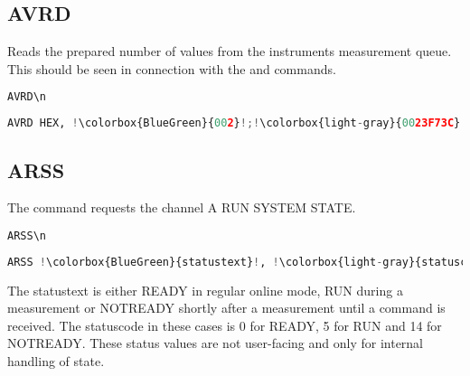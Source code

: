 \documentclass[]{scrartcl}
\begin{document}
	\subsection{AVRD}
	Reads the prepared number of values from the instruments measurement queue.
	This should be seen in connection with the  and  commands.
\begin{lstlisting}[language=Python,escapechar=!,caption=Request (AIC$\rightarrow{}$Instrument) Read Values from Queue,breaklines=true,showspaces=true]
AVRD\n
\end{lstlisting}
\begin{lstlisting}[language=Python,escapechar=!,caption=Response (Instrument$\rightarrow{}$AIC) Read Values from Queue,breaklines=true,showspaces=true]
AVRD HEX, !\colorbox{BlueGreen}{002}!;!\colorbox{light-gray}{0023F73C}!0023F725\n
\end{lstlisting}



	\subsection{ARSS}
	The  command requests the channel A RUN SYSTEM STATE.

\begin{lstlisting}[language=Python,escapechar=!,caption=Request (AIC$\rightarrow{}$Instrument) Read Values from Queue,breaklines=true,showspaces=true]
ARSS\n
\end{lstlisting}
\begin{lstlisting}[language=Python,escapechar=!,caption=Response (Instrument$\rightarrow{}$AIC) Read Values from Queue,breaklines=true,showspaces=true]
ARSS !\colorbox{BlueGreen}{statustext}!, !\colorbox{light-gray}{statuscode}!\n
\end{lstlisting}
The \colorbox{BlueGreen}{statustext} is either READY in regular online mode, RUN during a measurement or NOT\textunderscore{}READY shortly after a measurement until a  command is received.
The \colorbox{light-gray}{statuscode} in these cases is 0 for READY, 5 for RUN and 14 for NOT\textunderscore{}READY.
These status values are not user-facing and only for internal handling of state.
\end{document}
